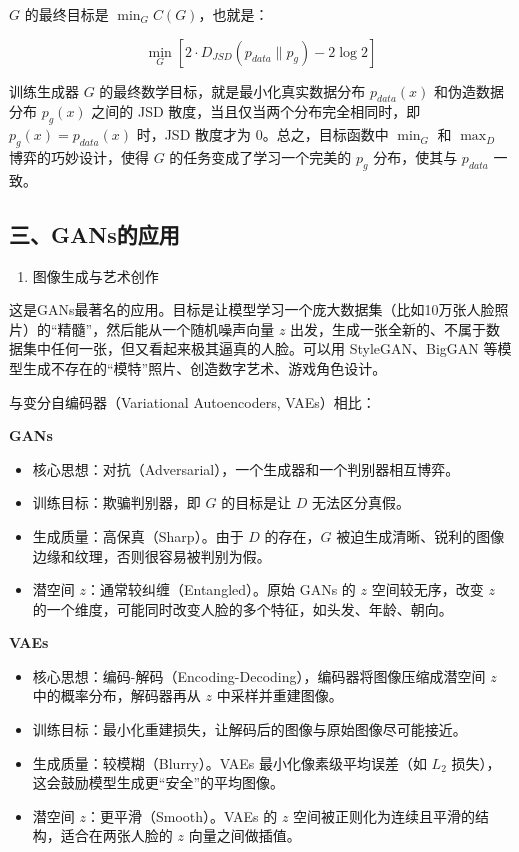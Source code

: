 \(G\) 的最终目标是 \(\min_G C(G)\)，也就是：

\[
\min_G [2\cdot D_{JSD}(p_{data}\parallel p_g)-2\log 2]
\]

训练生成器 \(G\) 的最终数学目标，就是最小化真实数据分布 \(p_{data}(x)\) 和伪造数据分布 \(p_g(x)\) 之间的 JSD 散度，当且仅当两个分布完全相同时，即 \(p_g(x)=p_{data}(x)\) 时，JSD 散度才为 \(0\)。总之，目标函数中 \(\min_G\) 和 \(\max_D\) 博弈的巧妙设计，使得 \(G\) 的任务变成了学习一个完美的 \(p_g\) 分布，使其与 \(p_{data}\) 一致。

\hypertarget{ux4e09gansux7684ux5e94ux7528}{%
\subsection{三、GANs的应用}\label{ux4e09gansux7684ux5e94ux7528}}

\begin{enumerate}
\def\labelenumi{\arabic{enumi}.}
\tightlist
\item
  图像生成与艺术创作
\end{enumerate}

这是GANs最著名的应用。目标是让模型学习一个庞大数据集（比如10万张人脸照片）的``精髓''，然后能从一个随机噪声向量 \(z\) 出发，生成一张全新的、不属于数据集中任何一张，但又看起来极其逼真的人脸。可以用 StyleGAN、BigGAN 等模型生成不存在的``模特''照片、创造数字艺术、游戏角色设计。

与变分自编码器（Variational Autoencoders, VAEs）相比：

\textbf{GANs}

\begin{itemize}
\tightlist
\item
  核心思想：对抗（Adversarial），一个生成器和一个判别器相互博弈。
\item
  训练目标：欺骗判别器，即 \(G\) 的目标是让 \(D\) 无法区分真假。
\item
  生成质量：高保真（Sharp）。由于 \(D\) 的存在，\(G\) 被迫生成清晰、锐利的图像边缘和纹理，否则很容易被判别为假。
\item
  潜空间 \(z\)：通常较纠缠（Entangled）。原始 GANs 的 \(z\) 空间较无序，改变 \(z\) 的一个维度，可能同时改变人脸的多个特征，如头发、年龄、朝向。
\end{itemize}

\textbf{VAEs}

\begin{itemize}
\tightlist
\item
  核心思想：编码-解码（Encoding-Decoding），编码器将图像压缩成潜空间 \(z\) 中的概率分布，解码器再从 \(z\) 中采样并重建图像。
\item
  训练目标：最小化重建损失，让解码后的图像与原始图像尽可能接近。
\item
  生成质量：较模糊（Blurry）。VAEs 最小化像素级平均误差（如 \(L_2\) 损失），这会鼓励模型生成更``安全''的平均图像。
\item
  潜空间 \(z\)：更平滑（Smooth）。VAEs 的 \(z\) 空间被正则化为连续且平滑的结构，适合在两张人脸的 \(z\) 向量之间做插值。
\end{itemize}

